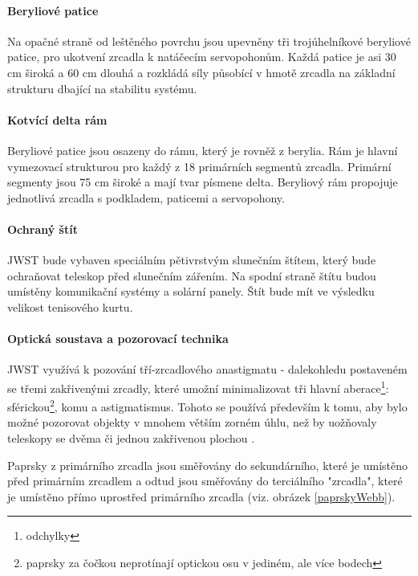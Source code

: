 \documentclass[a4paper,11pt]{article}
\begin{document}
\paragraph{Beryliové patice}
Na opačné straně od leštěného povrchu jsou upevněny tři trojúhelníkové beryliové patice, pro ukotvení zrcadla k natáčecím servopohonům. Každá patice je asi 30 cm široká a 60 cm dlouhá a rozkládá síly působící v hmotě zrcadla na základní strukturu dbající na stabilitu systému.

\paragraph{Kotvící delta rám}
Beryliové patice jsou osazeny do rámu, který je rovněž z berylia. Rám je hlavní vymezovací strukturou pro každý z 18 primárních segmentů zrcadla. Primární segmenty jsou 75 cm široké a mají tvar písmene delta. Beryliový rám propojuje jednotlivá zrcadla s podkladem, paticemi a servopohony.

\paragraph{Ochraný štít}
JWST bude vybaven speciálním pětivrstvým slunečním štítem, který bude ochraňovat teleskop před slunečním zářením. Na spodní straně štítu budou umístěny komunikační systémy a solární panely. Štít bude mít ve výsledku velikost tenisového kurtu.

\paragraph{Optická soustava a pozorovací technika}
JWST využívá k pozování tří-zrcadlového anastigmatu - dalekohledu postaveném se třemi zakřivenými zrcadly, které umožní minimalizovat tři hlavní aberace\footnote{odchylky}: sférickou\footnote{paprsky za čočkou neprotínají optickou osu v jediném, ale více bodech}, komu a astigmatismus. Tohoto se používá především k tomu, aby bylo možné pozorovat objekty v mnohem větším zorném úhlu, než by uožňovaly teleskopy se dvěma či jednou zakřivenou plochou \cite{wikipediaAnastigmat}.

Paprsky z primárního zrcadla jsou směřovány do sekundárního, které je umístěno před primárním zrcadlem a odtud jsou směřovány do terciálního "zrcadla", které je umístěno přímo uprostřed primárního zrcadla (viz. obrázek \ref{paprskyWebb}).
\end{document}
